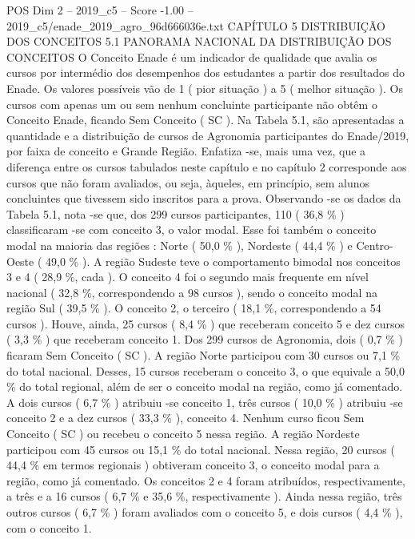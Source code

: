 \begin{textsample}{POS Dim 2 – 2019\_c5 – Score -1.00 – 2019\_c5/enade\_2019\_agro\_96d666036e.txt}  \label{ex:f2_pos_338}
CAPÍTULO 5 DISTRIBUIÇÃO DOS CONCEITOS 5.1 PANORAMA NACIONAL DA DISTRIBUIÇÃO DOS CONCEITOS O Conceito Enade é um indicador de qualidade que avalia os cursos por intermédio dos desempenhos dos estudantes a partir dos resultados do Enade.
Os valores possíveis vão de 1 ( pior situação ) a 5 ( melhor situação ).
Os cursos com apenas um ou sem nenhum concluinte participante não obtêm o Conceito Enade, ficando Sem Conceito ( SC ).
Na Tabela 5.1, são apresentadas a quantidade e a distribuição de cursos de Agronomia participantes do Enade/2019, por faixa de conceito e Grande Região.
Enfatiza -se, mais uma vez, que a diferença entre os cursos tabulados neste capítulo e no capítulo 2 corresponde aos cursos que não foram avaliados, ou seja, àqueles, em princípio, sem alunos concluintes que tivessem sido inscritos para a prova.
Observando -se os dados da Tabela 5.1, nota -se que, dos 299 cursos participantes, 110 ( 36,8 \% ) classificaram -se com conceito 3, o valor modal.
Esse foi também o conceito modal na maioria das regiões : Norte ( 50,0 \% ), Nordeste ( 44,4 \% ) e Centro-Oeste ( 49,0 \% ).
A região Sudeste teve o comportamento bimodal nos conceitos 3 e 4 ( 28,9 \%, cada ).
O conceito 4 foi o segundo mais frequente em nível nacional ( 32,8 \%, correspondendo a 98 cursos ), sendo o conceito modal na região Sul ( 39,5 \% ).
O conceito 2, o terceiro ( 18,1 \%, correspondendo a 54 cursos ).
Houve, ainda, 25 cursos ( 8,4 \% ) que receberam conceito 5 e dez cursos ( 3,3 \% ) que receberam conceito 1.
Dos 299 cursos de Agronomia, dois ( 0,7 \% ) ficaram Sem Conceito ( SC ).
A região Norte participou com 30 cursos ou 7,1 \% do total nacional.
Desses, 15 cursos receberam o conceito 3, o que equivale a 50,0 \% do total regional, além de ser o conceito modal na região, como já comentado.
A dois cursos ( 6,7 \% ) atribuiu -se conceito 1, três cursos ( 10,0 \% ) atribuiu -se conceito 2 e a dez cursos ( 33,3 \% ), conceito 4.
Nenhum curso ficou Sem Conceito ( SC ) ou recebeu o conceito 5 nessa região.
A região Nordeste participou com 45 cursos ou 15,1 \% do total nacional.
Nessa região, 20 cursos ( 44,4 \% em termos regionais ) obtiveram conceito 3, o conceito modal para a região, como já comentado.
Os conceitos 2 e 4 foram atribuídos, respectivamente, a três e a 16 cursos ( 6,7 \% e 35,6 \%, respectivamente ).
Ainda nessa região, três outros cursos ( 6,7 \% ) foram avaliados com o conceito 5, e dois cursos ( 4,4 \% ), com o conceito 1.

\end{textsample}
